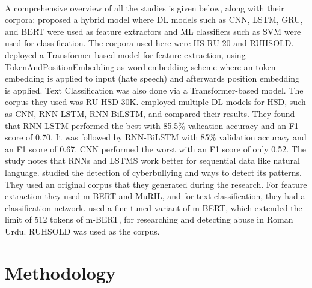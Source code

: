 \documentclass[11pt, a4paper]{article}
\begin{document}
\paragraph{}
A comprehensive overview of all the studies is given below, along with their corpora:
\newline\newline
{} proposed a hybrid model where DL models such as CNN, LSTM, GRU, and BERT were used as feature extractors and ML classifiers such as SVM were used for classification. The corpora used here were HS-RU-20\cite{hsru20corpus} and RUHSOLD\cite{ruhsoldcorpus}.
\newline\newline
{} deployed a Transformer-based model for feature extraction, using TokenAndPositionEmbedding as word embedding scheme where an token embedding is applied to input (hate speech) and afterwards position embedding is applied. Text Classification was also done via a Transformer-based model. The corpus they used was RU-HSD-30K\cite{ruhsd30kcorpus}.
\newline\newline
{} employed multiple DL models for HSD, such as CNN, RNN-LSTM, RNN-BiLSTM, and compared their results. They found that RNN-LSTM performed the best with 85.5\% valication accuracy and an F1 score of 0.70. It was followed by RNN-BiLSTM with 85\% validation accuracy and an F1 score of 0.67. CNN performed the worst with an F1 score of only 0.52\cite{dewanietal}. The study notes that RNNs and LSTMS work better for sequential data like natural language.
\newline\newline
{} studied the detection of cyberbullying and ways to detect its patterns. They used an original corpus that they generated during the research. For feature extraction they used m-BERT\cite{mbert2018} and MuRIL\cite{muril2021}, and for text classification, they had a classification network\cite{razietal}.
\newline\newline
{} used a fine-tuned variant of m-BERT\cite{modifiedmbert}, which extended the limit of 512 tokens of m-BERT, for researching and detecting abuse in Roman Urdu. RUHSOLD\cite{ruhsoldcorpus} was used as the corpus.

\section{Methodology}
\end{document}
